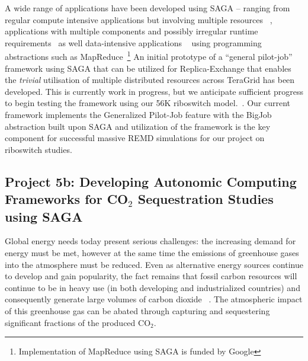\documentclass[a4paper,10pt]{article}
\begin{document}
A wide range of applications have been developed using SAGA -- ranging from regular compute 
intensive applications but involving multiple resources ~\cite{saga_escience07, gmac, REMD-
PhilTranA2009}, applications with multiple components and possibly irregular runtime 
requirements~\cite{saga_loosely_coupled, teragrid08} as well data-intensive applications 
~\cite{saga_data_intensive, saga_grid_cloud} using programming abstractions such as 
MapReduce~\footnote{Implementation of MapReduce using SAGA is funded by Google} An initial 
prototype of a ``general pilot-job'' framework using SAGA that can be utilized for Replica-Exchange 
that enables the {\it trivial} utilisation of multiple distributed resources across TeraGrid has 
been developed. This is currently work in progress, but we anticipate sufficient progress to begin 
testing the framework using our 56K riboswitch model.~\cite{REMD-PhilTranA2009}. %
Our current framework implements the Generalized Pilot-Job feature with the BigJob abstraction 
built upon SAGA and utilization of the framework is the key component for successful massive REMD 
simulations for our project on riboswitch studies.


\subsection*{Project 5b: Developing Autonomic Computing Frameworks for CO$_2$ Sequestration Studies using SAGA}

Global energy needs today present serious challenges: the increasing demand for energy must be met, 
however at the same time the emissions of greenhouse gases into the atmosphere must be reduced. 
Even as alternative energy sources continue to develop and gain popularity, the fact remains that 
fossil carbon resources will continue to be in heavy use (in both developing and industrialized 
countries) and consequently generate large volumes of carbon dioxide ~\cite{GeoRPT,Pawar}. The 
atmospheric impact of this greenhouse gas can be abated through capturing and sequestering 
significant fractions of the produced CO$_2$.
\end{document}
